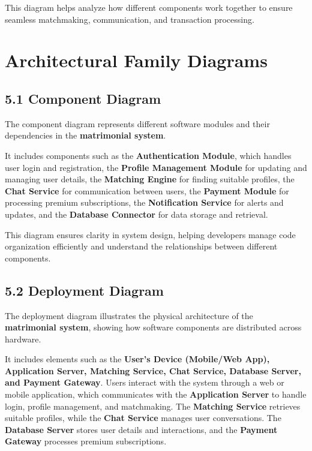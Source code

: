 This diagram helps analyze how different components work together to
ensure seamless matchmaking, communication, and transaction processing.

\section{Architectural Family
Diagrams}\label{architectural-family-diagrams}

\subsection{5.1 Component Diagram}\label{component-diagram}

The component diagram represents different software modules and their
dependencies in the \textbf{matrimonial system}.

It includes components such as the \textbf{Authentication Module}, which
handles user login and registration, the \textbf{Profile Management
Module} for updating and managing user details, the \textbf{Matching
Engine} for finding suitable profiles, the \textbf{Chat Service} for
communication between users, the \textbf{Payment Module} for processing
premium subscriptions, the \textbf{Notification Service} for alerts and
updates, and the \textbf{Database Connector} for data storage and
retrieval.

This diagram ensures clarity in system design, helping developers manage
code organization efficiently and understand the relationships between
different components.

\subsection{5.2 Deployment Diagram}\label{deployment-diagram}

\protect{}\label{_Toc287863431}{}The deployment diagram
illustrates the physical architecture of the \textbf{matrimonial
system}, showing how software components are distributed across
hardware.

It includes elements such as the \textbf{User's Device (Mobile/Web App),
Application Server, Matching Service, Chat Service, Database Server, and
Payment Gateway}. Users interact with the system through a web or mobile
application, which communicates with the \textbf{Application Server} to
handle login, profile management, and matchmaking. The \textbf{Matching
Service} retrieves suitable profiles, while the \textbf{Chat Service}
manages user conversations. The \textbf{Database Server} stores user
details and interactions, and the \textbf{Payment Gateway} processes
premium subscriptions.

